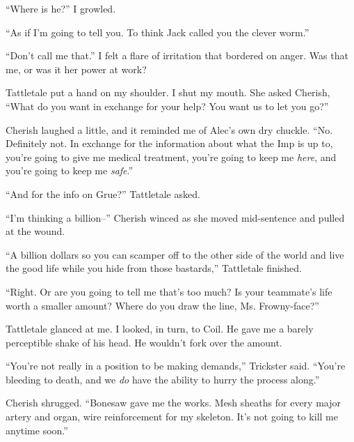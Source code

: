 





``Where is he?'' I growled.



``As if I'm going to tell you.  To think Jack called you the clever worm.''



``Don't call me that.''  I felt a flare of irritation that bordered on anger.  Was that me, or was it her power at work?



Tattletale put a hand on my shoulder.  I shut my mouth.  She asked Cherish, ``What do you want in exchange for your help?  You want us to let you go?''



Cherish laughed a little, and it reminded me of Alec's own dry chuckle.  ``No.  Definitely not.  In exchange for the information about what the Imp is up to, you're going to give me medical treatment, you're going to keep me \emph{here}, and you're going to keep me \emph{safe}.''



``And for the info on Grue?''  Tattletale asked.



``I'm thinking a billion--''  Cherish winced as she moved mid-sentence and pulled at the wound.



``A billion dollars so you can scamper off to the other side of the world and live the good life while you hide from those bastards,'' Tattletale finished.



``Right.  Or are you going to tell me that's too much?  Is your teammate's life worth a smaller amount?  Where do you draw the line, Ms. Frowny-face?''



Tattletale glanced at me.  I looked, in turn, to Coil.  He gave me a barely perceptible shake of his head.  He wouldn't fork over the amount.



``You're not really in a position to be making demands,'' Trickster said.  ``You're bleeding to death, and we \emph{do} have the ability to hurry the process along.''



Cherish shrugged.  ``Bonesaw gave me the works.  Mesh sheaths for every major artery and organ, wire reinforcement for my skeleton.  It's not going to kill me anytime soon.''



